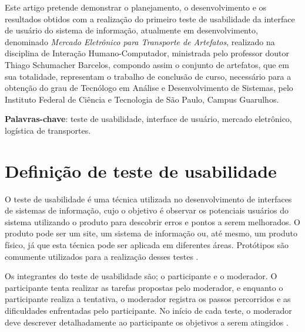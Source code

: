 \documentclass[
	article,
	11pt,
	oneside,
	a4paper,
	english,
	brazil,
	sumario=tradicional
]{abntex2}
\begin{document}
\frenchspacing
\maketitle

\begin{resumoumacoluna}

	Este artigo pretende demonstrar o planejamento, o desenvolvimento e os resultados obtidos com a realização do primeiro teste de usabilidade da interface de usuário do sistema de informação, atualmente em desenvolvimento, denominado \textit{Mercado Eletrônico para Transporte de Artefatos}, realizado na disciplina de Interação Humano-Computador, ministrada pelo professor doutor Thiago Schumacher Barcelos, compondo assim o conjunto de artefatos, que em sua totalidade, representam o trabalho de conclusão de curso, necessário para a obtenção do grau de Tecnólogo em Análise e Desenvolvimento de Sistemas, pelo Instituto Federal de Ciência e Tecnologia de São Paulo, Campus Guarulhos. 
	
	\vspace{\onelineskip}
	\noindent

	\textbf{Palavras-chave}: teste de usabilidade, interface de usuário, mercado eletrônico, logística de transportes.
\end{resumoumacoluna}

\textual
\pagebreak

\renewcommand{\contentsname}{SUMÁRIO}

\pdfbookmark[0]{\contentsname}{toc}
\tableofcontents*
\cleardoublepage

\section*{Definição de teste de usabilidade}
	
	O teste de usabilidade é uma técnica utilizada no desenvolvimento de interfaces de sistemas de informação, cujo o objetivo é observar os potenciais usuários do sistema utilizando o produto para descobrir erros e pontos a serem melhorados. O produto pode ser um site, um sistema de informação ou, até mesmo, um produto físico, já que esta técnica pode ser aplicada em diferentes áreas. Protótipos são comumente utilizados para a realização desses testes \cite{usabilidade-na-web}.
	
	Os integrantes do teste de usabilidade são; o participante e o moderador. O participante tenta realizar as tarefas propostas pelo moderador, e enquanto o participante realiza a tentativa, o moderador registra os passos percorridos e as dificuldades enfrentadas pelo participante. No início de cada teste, o moderador deve descrever detalhadamente ao participante os objetivos a serem atingidos \cite{usabilidade-na-web}.
	
\end{document}
